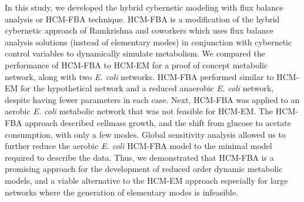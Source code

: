 \documentclass[10pt,twocolumn,twoside,final]{IEEEtran}
\begin{document}
In this study, we developed the hybrid cybernetic modeling with flux balance analysis or HCM-FBA technique.
HCM-FBA is a modification of the hybrid cybernetic approach of Ramkrishna and coworkers which uses flux balance analysis solutions
(instead of elementary modes) in conjunction with cybernetic control variables to dynamically simulate metabolism.
We compared the performance of HCM-FBA to HCM-EM for a proof of concept metabolic network, along with two \emph{E. coli} networks.
HCM-FBA performed similar to HCM-EM for the hypothetical network and a reduced anaerobic \textit{E. coli} network, despite having fewer parameters in each case.
Next, HCM-FBA was applied to an aerobic \textit{E. coli} metabolic network that was not feasible for HCM-EM.
The HCM-FBA approach described cellmass growth, and the shift from glucose to acetate consumption, with only a few modes.
Global sensitivity analysis allowed us to further reduce the aerobic \textit{E. coli} HCM-FBA model to the minimal model required to describe the data.
Thus, we demonstrated that HCM-FBA is a promising approach for the development of reduced order dynamic metabolic models,
and a viable alternative to the HCM-EM approach especially for large networks where the generation of elementary modes is infeasible.

\end{document}

